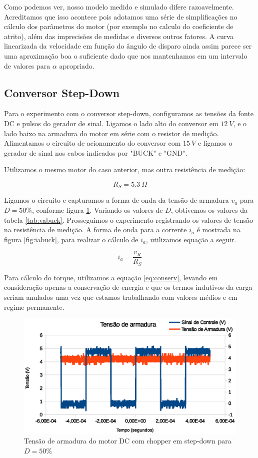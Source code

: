 \documentclass{article}
\begin{document}
Como podemos ver, nosso modelo medido e simulado difere razoavelmente. Acreditamos que isso acontece pois adotamos uma série de simplificações no cálculo dos parâmetros do motor (por exemplo no calculo do coeficiente de atrito), além das imprecisões de medidas e diversos outros fatores. A curva linearizada da velocidade em função do ângulo de disparo ainda assim parece ser uma aproximação boa o suficiente dado que nos mantenhamos em um intervalo de valores para $\alpha$ apropriado.
\subsection{Conversor Step-Down}
Para o experimento com o conversor step-down, configuramos as tensões da fonte DC e pulsos do gerador de sinal. Ligamos o lado alto do conversor em $12\ V$, e o lado baixo na armadura do motor em série com o resistor de medição. Alimentamos o circuito de acionamento do conversor com $15\ V$ e ligamos o gerador de sinal nos cabos indicados por "BUCK" e "GND".

Utilizamos o mesmo motor do caso anterior, mas outra resistência de medição:

\begin{equation}
R_S=5.3\ \Omega
\end{equation}

Ligamos o circuito e capturamos a forma de onda da tensão de armadura $v_a$ para $D=50\%$, conforme figura \ref{fig:vabuck}. Variando os valores de $D$, obtivemos os valores da tabela \ref{tab:vabuck}. Prosseguimos o experimento registrando os valores de tensão na resistência de medição. A forma de onda para a corrente $i_a$ é mostrada na figura \ref{fig:iabuck}, para realizar o cálculo de $i_a$, utilizamos equação a seguir.

\begin{equation}
i_a=\frac{v_R}{R_S}
\end{equation}

Para cálculo do torque, utilizamos a equação \ref{eq:conserv}, levando em consideração apenas a conservação de energia e que os termos indutivos da carga seriam anulados uma vez que estamos trabalhando com valores médios e em regime permanente.

\begin{figure}[H]
	\centering
	\includegraphics[width=\linewidth]{Dados/Buck/va}
	\caption{Tensão de armadura do motor DC com chopper em step-down para $D=50\%$}
	\label{fig:vabuck}
\end{figure}
\end{document}
